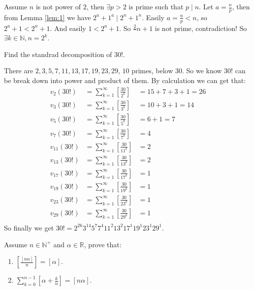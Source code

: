 \documentclass{ctexart}
\begin{document}
\begin{solution}
	Assume \(n\) is not power of \(2\), then \(\exists p>2\) is prime such that \(p \mid n\).
	Let \(a=\frac{n}{p}\), then from Lemma \ref{lem:1} we have \(2^a+1^a \mid 2^n+1^n\).
	Easily \(a=\frac{n}{p}<n\), so \(2^a+1<2^n+1\). And easily \(1<2^a+1\).
	So \(\frac{2}^n+1\) is not prime, contradiction!
	So \(\exists k \in \mathbb{N},n=2^k\).
\end{solution}
\begin{problem}\label{pro:p16.1}
Find the standrad decomposition of \(30!\).
\end{problem}
\begin{solution}
	There are \(2,3,5,7,11,13,17,19,23,29\), \(10\) primes, below \(30\).
	So we know \(30!\) can be break down into power and product of them.
	By calculation we can get that:
	\begin{equation}\label{equ:1}
		\begin{aligned}
			v_2(30!)    & =\sum_{k=1}^{\infty}\left[\frac{30}{2^k}\right]    & =15+7+3+1=26 \\
			v_3(30!)    & =\sum_{k=1}^{\infty}\left[\frac{30}{3^k}\right]    & =10+3+1=14   \\
			v_5(30!)    & =\sum_{k=1}^{\infty}\left[\frac{30}{5^k}\right]    & =6+1=7       \\
			v_7(30!)    & =\sum_{k=1}^{\infty}\left[\frac{30}{7^k}\right]    & =4           \\
			v_{11}(30!) & =\sum_{k=1}^{\infty}\left[\frac{30}{{11}^k}\right] & =2           \\
			v_{13}(30!) & =\sum_{k=1}^{\infty}\left[\frac{30}{{13}^k}\right] & =2           \\
			v_{17}(30!) & =\sum_{k=1}^{\infty}\left[\frac{30}{{17}^k}\right] & =1           \\
			v_{19}(30!) & =\sum_{k=1}^{\infty}\left[\frac{30}{{19}^k}\right] & =1           \\
			v_{23}(30!) & =\sum_{k=1}^{\infty}\left[\frac{30}{{23}^k}\right] & =1           \\
			v_{29}(30!) & =\sum_{k=1}^{\infty}\left[\frac{30}{{29}^k}\right] & =1           \\
		\end{aligned}
	\end{equation}
	So finally we get \(30! = 2^{26} 3^{14} 5^7 7^4 11^2 13^2 17^1 19^1 23^1 29^1\).
\end{solution}
\begin{problem}\label{pro:p16.2}
Assume \(n \in \mathbb{N}^+\) and \(\alpha \in \mathbb{R}\), prove that:
\begin{enumerate}
	\item \(\left[\frac{[n \alpha]}{n}\right]=[\alpha]\).
	\item \(\sum_{k=0}^{n-1}[\alpha+\frac{k}{n}]=[n \alpha]\).
\end{enumerate}
\end{problem}
\end{document}
